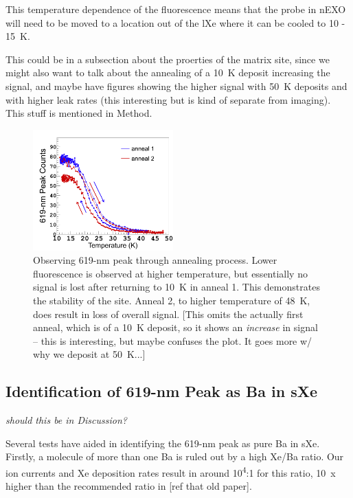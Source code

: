 \documentclass[aps,pra,reprint,superscriptaddress]{revtex4-1}
\begin{document}
This temperature dependence of the fluorescence means that the probe in nEXO will need to be moved to a location out of the lXe where it can be cooled to 10 - 15~K.

{\color{gray}This could be in a subsection about the proerties of the matrix site, since we might also want to talk about the annealing of a 10~K deposit increasing the signal, and maybe have figures showing the higher signal with 50~K deposits and with higher leak rates (this interesting but is kind of separate from imaging).  This stuff is mentioned in Method.}

\begin{figure}
\includegraphics[width=0.48\textwidth]{figures/paper_single-atom_619-anneal_20150916_runs36and37_omitRun34_arrows.png}
\caption{Observing 619-nm peak through annealing process.  Lower fluorescence is observed at higher temperature, but essentially no signal is lost after returning to 10~K in anneal 1.  This demonstrates the stability of the site.  Anneal 2, to higher temperature of 48~K, does result in loss of overall signal.  {\color{red}[This omits the actually first anneal, which is of a 10~K deposit, so it shows an \emph{increase} in signal -- this is interesting, but maybe confuses the plot.  It goes more w/ why we deposit at 50~K...]}}
\label{fig:anneal}
\end{figure}

\subsection{Identification of 619-nm Peak as Ba in sXe}

{\color{gray}\emph{should this be in Discussion?}}

Several tests have aided in identifying the 619-nm peak as pure Ba in sXe.  Firstly, a molecule of more than one Ba is ruled out by a high Xe/Ba ratio.  Our ion currents and Xe deposition rates result in around 10\textsuperscript{4}:1 for this ratio, 10~x higher than the recommended ratio in [ref that old paper].
\end{document}
